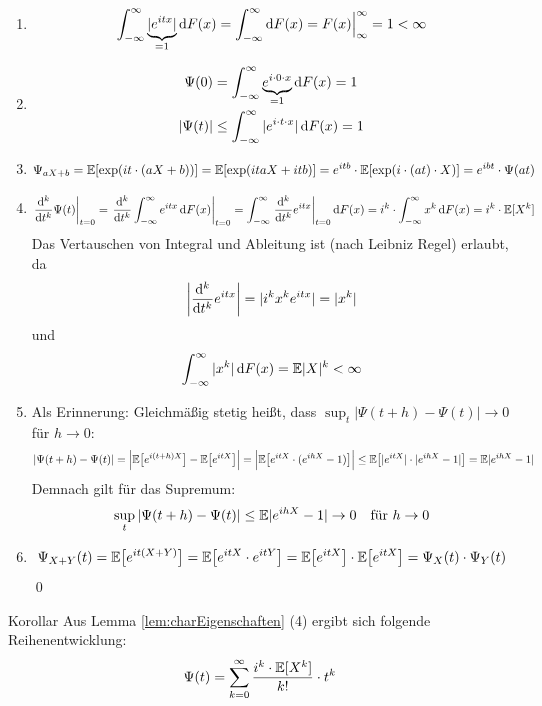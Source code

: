 \begin{enumerate}
    \item 
    \[
        \int_{-\infty}^{\infty} \underbrace{|e^{itx}|}_{=1} \mathop{}\!\mathrm{d} F(x) 
        = \int_{-\infty}^{\infty} \mathop{}\!\mathrm{d} F(x) = F(x)\Big|_\infty^\infty = 1 < \infty
    \]

    \item 
    \begin{align*}
        \Psi(0) &= \int_{-\infty}^{\infty} \underbrace{e^{i\cdot 0 \cdot x}}_{=1} \mathop{}\!\mathrm{d} F(x) = 1 \\
        |\Psi(t)| &\leq \int_{-\infty}^{\infty} |e^{i\cdot t \cdot x}| \mathop{}\!\mathrm{d} F(x) = 1 
    \end{align*}
    \item
    \[
        \Psi_{aX+b} = \mathbb E[\exp(it\cdot(aX+b))] = \mathbb E[\exp(itaX + itb)] = e^{itb}\cdot \mathbb E[\exp(i\cdot(at)\cdot X)] = e^{ibt}\cdot\Psi(at)
    \]
    \item 
    \[
        \left.\dfrac{\diff^k}{\diff t^k} \Psi(t) \right|_{t=0} 
        = \left.\dfrac{\diff^k}{\diff t^k} \int_{-\infty}^{\infty} e^{itx}\diff F(x) \right|_{t=0} 
        = \int_{-\infty}^{\infty} \left.\dfrac{\diff^k}{\diff t^k} e^{itx}\right|_{t=0} \diff F(x) 
        = i^k\cdot \int_{-\infty}^{\infty} x^k \diff F(x) = i^k\cdot\E[X^k]
    \]
    Das Vertauschen von Integral und Ableitung ist (nach Leibniz Regel) erlaubt, da 
    \[
        \left|\dfrac{\mathop{}\!\mathrm{d}^k}{\mathop{}\!\mathrm{d} t^k} e^{itx}\right| = |i^k x^k e^{itx}| = |x^k|
    \] 
    und 
    \[
        \int_{-\infty}^{\infty} |x^k| \mathop{}\!\mathrm{d} F(x) = \mathbb E|X|^k < \infty
    \]
    \item Als Erinnerung: Gleichmäßig stetig heißt, dass $\sup_t|\Psi(t+h)-\Psi(t)| \to 0$ für $h\to 0$:
    \[
        |\Psi(t+h)-\Psi(t)| = \Big|\mathbb E\big[e^{i(t+h)X}\big] - \mathbb E\big[e^{itX}\big]\Big| 
        = \Big|\mathbb E\big[e^{itX}\cdot(e^{ihX}-1)\big]\Big| \leq \mathbb E\big[|e^{itX}|\cdot|e^{ihX}-1|\big] = \mathbb E|e^{ihX}-1|
    \]
    Demnach gilt für das Supremum:
    \[
        \sup_t|\Psi(t+h)-\Psi(t)| \leq \mathbb E|e^{ihX}-1| \to 0 \quad\text{für }h\to 0
    \]
    \item 
    \[
        \Psi_{X+Y}(t) = \mathbb E\big[e^{it(X+Y)}\big] = \mathbb E\big[e^{itX}\cdot e^{itY}\big] 
        = \mathbb E\big[e^{itX}\big]\cdot\mathbb E\big[e^{itX}\big] = \Psi_X(t)\cdot\Psi_Y(t)
    \]
    \qed
\end{enumerate}

\begin{colbox}{Korollar}\label{kor:charReihe}
    Aus Lemma \ref{lem:charEigenschaften} (4) ergibt sich folgende Reihenentwicklung:
    \[
        \Psi(t) = \sum_{k=0}^{\infty}\dfrac{i^k\cdot\mathbb E[X^k]}{k!}\cdot t^k
    \]
\end{colbox}

